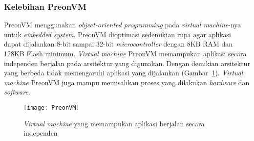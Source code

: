 \subsubsection{Kelebihan PreonVM}
PreonVM menggunakan {\it object-oriented programming} pada {\it virtual machine}-nya untuk {\it embedded system}. PreonVM dioptimasi sedemikian rupa agar aplikasi dapat dijalankan 8-bit sampai 32-bit {\it microcontroller} dengan 8KB RAM dan 128KB Flash minimum. {\it Virtual machine} PreonVM memampukan aplikasi secara independen berjalan pada arsitektur yang digunakan. Dengan demikian arsitektur yang berbeda tidak memengaruhi aplikasi yang dijalankan (Gambar~\ref{fig:PreonVM}). {\it Virtual machine} PreonVM juga mampu memisahkan proses yang dilakukan {\it hardware} dan {\it software}. 

\begin{figure} [H]
	\centering  
	\texttt{[image: PreonVM]}  
	\caption[{\it Virtual machine} yang memampukan aplikasi berjalan secara independen]{{\it Virtual machine} yang memampukan aplikasi berjalan secara independen} 
	\label{fig:PreonVM} 
\end{figure} 


